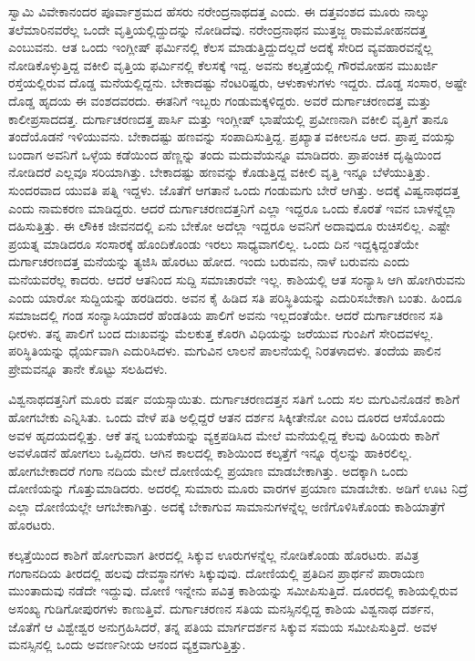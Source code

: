 ಸ್ವಾಮಿ ವಿವೇಕಾನಂದರ ಪೂರ್ವಾಶ್ರಮದ ಹೆಸರು ನರೇಂದ್ರನಾಥದತ್ತ ಎಂದು. ಈ ದತ್ತವಂಶದ ಮೂರು ನಾಲ್ಕು ತಲೆಮಾರಿನವರೆಲ್ಲ ಒಂದೇ ವೃತ್ತಿಯಲ್ಲಿದ್ದುದನ್ನು ನೋಡಿದೆವು. ನರೇಂದ್ರನಾಥನ ಮುತ್ತಜ್ಜ ರಾಮಮೋಹನದತ್ತ ಎಂಬುವನು. ಆತ ಒಂದು ಇಂಗ್ಲೀಷ್ ಫರ್ಮಿನಲ್ಲಿ ಕೆಲಸ ಮಾಡುತ್ತಿದ್ದುದಲ್ಲದೆ ಅದಕ್ಕೆ ಸೇರಿದ ವ್ಯವಹಾರವನ್ನೆಲ್ಲ ನೋಡಿಕೊಳ್ಳುತ್ತಿದ್ದ ವಕೀಲಿ ವೃತ್ತಿಯ ಫರ್ಮಿನಲ್ಲಿ ಕೆಲಸಕ್ಕೆ ಇದ್ದ. ಅವನು ಕಲ್ಕತ್ತೆಯಲ್ಲಿ ಗೌರಮೋಹನ ಮುಖರ್ಜಿ ರಸ್ತೆಯಲ್ಲಿರುವ ದೊಡ್ಡ ಮನೆಯಲ್ಲಿದ್ದನು. ಬೇಕಾದಷ್ಟು ನೆಂಟರಿಷ್ಟರು, ಆಳುಕಾಳುಗಳು ಇದ್ದರು. ದೊಡ್ಡ ಸಂಸಾರ, ಅಷ್ಟೇ ದೊಡ್ಡ ಹೃದಯ ಈ ವಂಶದವರದು. ಈತನಿಗೆ ಇಬ್ಬರು ಗಂಡುಮಕ್ಕಳಿದ್ದರು. ಅವರೆ ದುರ್ಗಾಚರಣದತ್ತ ಮತ್ತು ಕಾಲೀಪ್ರಸಾದದತ್ತ. ದುರ್ಗಾಚರಣದತ್ತ ಪಾರ್ಸಿ ಮತ್ತು ಇಂಗ್ಲೀಷ್ ಭಾಷೆಯಲ್ಲಿ ಪ್ರವೀಣನಾಗಿ ವಕೀಲಿ ವೃತ್ತಿಗೆ ತಾನೂ ತಂದೆಯೊಡನೆ ಇಳಿಯುವನು. ಬೇಕಾದಷ್ಟು ಹಣವನ್ನು ಸಂಪಾದಿಸುತ್ತಿದ್ದ. ಪ್ರಖ್ಯಾತ ವಕೀಲನೂ ಆದ. ಪ್ರಾಪ್ತ ವಯಸ್ಸು ಬಂದಾಗ ಅವನಿಗೆ ಒಳ್ಳೆಯ ಕಡೆಯಿಂದ ಹೆಣ್ಣನ್ನು ತಂದು ಮದುವೆಯನ್ನೂ ಮಾಡಿದರು. ಪ್ರಾಪಂಚಿಕ ದೃಷ್ಟಿಯಿಂದ ನೋಡಿದರೆ ಎಲ್ಲವೂ ಸರಿಯಾಗಿತ್ತು. ಬೇಕಾದಷ್ಟು ಹಣವನ್ನು ಕೊಡುತ್ತಿದ್ದ ವಕೀಲಿ ವೃತ್ತಿ ಇನ್ನೂ ಬೆಳೆಯುತ್ತಿತ್ತು. ಸುಂದರವಾದ ಯುವತಿ ಪತ್ನಿ ಇದ್ದಳು. ಜೊತೆಗೆ ಆಗತಾನೆ ಒಂದು ಗಂಡುಮಗು ಬೇರೆ ಆಗಿತ್ತು. ಅದಕ್ಕೆ ವಿಷ್ವನಾಥದತ್ತ ಎಂದು ನಾಮಕರಣ ಮಾಡಿದ್ದರು. ಆದರೆ ದುರ್ಗಾಚರಣದತ್ತನಿಗೆ ಎಲ್ಲಾ ಇದ್ದರೂ ಒಂದು ಕೊರತೆ ಇವನ ಬಾಳನ್ನೆಲ್ಲಾ ದಹಿಸುತ್ತಿತ್ತು. ಈ ಲೌಕಿಕ ಜೀವನದಲ್ಲಿ ಏನು ಬೇಕೋ ಅದೆಲ್ಲಾ ಇದ್ದರೂ ಅವನಿಗೆ ಅದಾವುದೂ ರುಚಿಸಲಿಲ್ಲ. ಎಷ್ಟೇ ಪ್ರಯತ್ನ ಮಾಡಿದರೂ ಸಂಸಾರಕ್ಕೆ ಹೊಂದಿಕೊಂಡು ಇರಲು ಸಾಧ್ಯವಾಗಲಿಲ್ಲ. ಒಂದು ದಿನ ಇದ್ದಕ್ಕಿದ್ದಂತೆಯೇ ದುರ್ಗಾಚರಣದತ್ತ ಮನೆಯನ್ನು ತ್ಯಜಿಸಿ ಹೊರಟು ಹೋದ. ಇಂದು ಬರುವನು, ನಾಳೆ ಬರುವನು ಎಂದು ಮನೆಯವರೆಲ್ಲ ಕಾದರು. ಆದರೆ ಆತನಿಂದ ಸುದ್ದಿ ಸಮಾಚಾರವೇ ಇಲ್ಲ. ಕಾಶಿಯಲ್ಲಿ ಆತ ಸಂನ್ಯಾಸಿ ಆಗಿ ಹೋಗಿರುವನು ಎಂದು ಯಾರೋ ಸುದ್ದಿಯನ್ನು ಹರಡಿದರು. ಅವನ ಕೈ ಹಿಡಿದ ಸತಿ ಪರಿಸ್ಥಿತಿಯನ್ನು ಎದುರಿಸಬೇಕಾಗಿ ಬಂತು. ಹಿಂದೂ ಸಮಾಜದಲ್ಲಿ ಗಂಡ ಸಂನ್ಯಾಸಿಯಾದರೆ ಹೆಂಡತಿಯ ಪಾಲಿಗೆ ಅವನು ಇಲ್ಲದಂತೆಯೇ. ಆದರೆ ದುರ್ಗಾಚರಣನ ಸತಿ ಧೀರಳು. ತನ್ನ ಪಾಲಿಗೆ ಬಂದ ದುಃಖವನ್ನು ಮೆಲಕುತ್ತ ಕೊರಗಿ ವಿಧಿಯನ್ನು ಜರೆಯುವ ಗುಂಪಿಗೆ ಸೇರಿದವಳಲ್ಲ. ಪರಿಸ್ಥಿತಿಯನ್ನು ಧೈರ್ಯವಾಗಿ ಎದುರಿಸಿದಳು. ಮಗುವಿನ ಲಾಲನೆ ಪಾಲನೆಯಲ್ಲಿ ನಿರತಳಾದಳು. ತಂದೆಯ ಪಾಲಿನ ಪ್ರೇಮವನ್ನೂ ತಾನೇ ಕೊಟ್ಟು ಸಲಹಿದಳು. 

ವಿಶ್ವನಾಥದತ್ತನಿಗೆ ಮೂರು ವರ್ಷ ವಯಸ್ಸಾಯಿತು. ದುರ್ಗಾಚರಣದತ್ತನ ಸತಿಗೆ ಒಂದು ಸಲ ಮಗುವಿನೊಡನೆ ಕಾಶಿಗೆ ಹೋಗಬೇಕು ಎನ್ನಿಸಿತು. ಒಂದು ವೇಳೆ ಪತಿ ಅಲ್ಲಿದ್ದರೆ ಆತನ ದರ್ಶನ ಸಿಕ್ಕೀತೇನೋ ಎಂಬ ದೂರದ ಆಸೆಯೊಂದು ಅವಳ ಹೃದಯದಲ್ಲಿತ್ತು. ಆಕೆ ತನ್ನ ಬಯಕೆಯನ್ನು ವ್ಯಕ್ತಪಡಿಸಿದ ಮೇಲೆ ಮನೆಯಲ್ಲಿದ್ದ ಕೆಲವು ಹಿರಿಯರು ಕಾಶಿಗೆ ಅವಳೊಡನೆ ಹೋಗಲು ಒಪ್ಪಿದರು. ಆಗಿನ ಕಾಲದಲ್ಲಿ ಕಾಶಿಯಿಂದ ಕಲ್ಕತ್ತೆಗೆ ಇನ್ನೂ ರೈಲನ್ನು ಹಾಕಿರಲಿಲ್ಲ. ಹೋಗಬೇಕಾದರೆ ಗಂಗಾ ನದಿಯ ಮೇಲೆ ದೋಣಿಯಲ್ಲಿ ಪ್ರಯಾಣ ಮಾಡಬೇಕಾಗಿತ್ತು. ಅದಕ್ಕಾಗಿ ಒಂದು ದೋಣಿಯನ್ನು ಗೊತ್ತುಮಾಡಿದರು. ಅದರಲ್ಲಿ ಸುಮಾರು ಮೂರು ವಾರಗಳ ಪ್ರಯಾಣ ಮಾಡಬೇಕು. ಅಡಿಗೆ ಊಟ ನಿದ್ರೆ ಎಲ್ಲಾ ದೋಣಿಯಲ್ಲೇ ಆಗಬೇಕಾಗಿತ್ತು. ಅದಕ್ಕೆ ಬೇಕಾಗುವ ಸಾಮಾನುಗಳನ್ನೆಲ್ಲ ಅಣಿಗೊಳಿಸಿಕೊಂಡು ಕಾಶಿಯಾತ್ರೆಗೆ ಹೊರಟರು. 

ಕಲ್ಕತ್ತೆಯಿಂದ ಕಾಶಿಗೆ ಹೋಗುವಾಗ ತೀರದಲ್ಲಿ ಸಿಕ್ಕುವ ಊರುಗಳನ್ನೆಲ್ಲ ನೋಡಿಕೊಂಡು ಹೊರಟರು. ಪವಿತ್ರ ಗಂಗಾನದಿಯ ತೀರದಲ್ಲಿ ಹಲವು ದೇವಸ್ಥಾನಗಳು ಸಿಕ್ಕುವುವು. ದೋಣಿಯಲ್ಲಿ ಪ್ರತಿದಿನ ಪ್ರಾರ್ಥನೆ ಪಾರಾಯಣ ಮುಂತಾದುವು ನಡೆದೇ ಇದ್ದುವು. ದೋಣಿ ಇನ್ನೇನು ಪವಿತ್ರ ಕಾಶಿಯನ್ನು ಸಮೀಪಿಸುತ್ತಿದೆ. ದೂರದಲ್ಲಿ ಕಾಶಿಯಲ್ಲಿರುವ ಅಸಂಖ್ಯ ಗುಡಿಗೋಪುರಗಳು ಕಾಣುತ್ತಿವೆ. ದುರ್ಗಾಚರಣನ ಸತಿಯ ಮನಸ್ಸಿನಲ್ಲಿದ್ದ ಕಾಶಿಯ ವಿಶ್ವನಾಥ ದರ್ಶನ, ಜೊತೆಗೆ ಆ ವಿಶ್ವೇಶ್ವರ ಅನುಗ್ರಹಿಸಿದರೆ, ತನ್ನ ಪತಿಯ ಮಾರ್ಗದರ್ಶನ ಸಿಕ್ಕುವ ಸಮಯ ಸಮೀಪಿಸುತ್ತಿದೆ. ಅವಳ ಮನಸ್ಸಿನಲ್ಲಿ ಒಂದು ಅವರ್ಣನೀಯ ಆನಂದ ವ್ಯಕ್ತವಾಗುತ್ತಿತ್ತು. 

